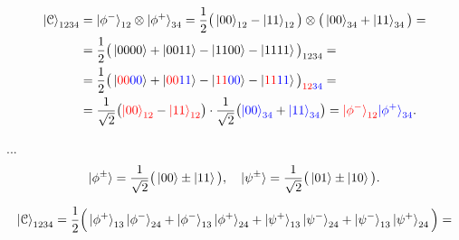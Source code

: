 \documentclass[a4paper,11pt]{article}
\newcommand{\rc}{\textcolor{red}}
\newcommand{\bc}{\textcolor{blue}}
\begin{document}
\begin{align}
\ket{\mathcal{C}}_{1234} &= \ket{\phi^-}_{12} \otimes \ket{\phi^+}_{34}
= \dfrac{1}{2} \big(\ket{00}_{12} - \ket{11}_{12} \big) \otimes \big( \ket{00}_{34} + \ket{11}_{34} \big) = \nonumber \\
&= \dfrac{1}{2} \big(\ket{0000} + \ket{0011} - \ket{1100} - \ket{1111}\big)_{1234} = \nonumber \\
&= \dfrac{1}{2} \big(\ket{\rc{00}\bc{00}} + \ket{\rc{00}\bc{11}} - \ket{\rc{11}\bc{00}} - \ket{\rc{11}\bc{11}}\big)_{\rc{12}\bc{34}} = \nonumber \\
&= \dfrac{1}{\sqrt2} \big(\rc{\ket{00}_{12}} - \rc{\ket{11}_{12}} \big) \cdot \dfrac{1}{\sqrt2} \big( \bc{\ket{00}_{34}} + \bc{\ket{11}_{34}} \big) = \rc{\ket{\phi^-}_{12}} \bc{\ket{\phi^+}_{34}}. \label{state2}
\end{align}

\iffalse ...
\begin{equation*}
\ket{\phi^{\pm}} = \dfrac{1}{\sqrt2}\big(\ket{00} \pm \ket{11} \big), \quad
\ket{\psi^{\pm}} = \dfrac{1}{\sqrt2}\big(\ket{01} \pm \ket{10} \big).
\end{equation*}


\begin{align*}
\ket{\mathcal{C}}_{1234} = \dfrac{1}{2} \Big(\ket{\phi^+}_{13} \ket{\phi^-}_{24} + 
\ket{\phi^-}_{13} \ket{\phi^+}_{24} +
\ket{\psi^+}_{13} \ket{\psi^-}_{24} +
\ket{\psi^-}_{13} \ket{\psi^+}_{24} \Big) = \nonumber \\
\end{align*}
\end{document}

